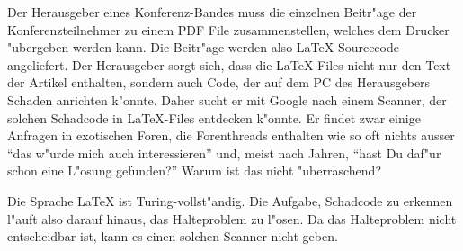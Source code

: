 Der Herausgeber eines Konferenz-Bandes muss die einzelnen Beitr"age der 
Konferenzteilnehmer zu einem PDF File zusammenstellen, welches dem Drucker
"ubergeben werden kann.
Die Beitr"age werden also \LaTeX-Sourcecode angeliefert.
Der Herausgeber sorgt sich, dass die \LaTeX-Files nicht nur den Text
der Artikel enthalten, sondern auch Code, der auf dem PC des Herausgebers
Schaden anrichten k"onnte.
Daher sucht er mit Google nach einem Scanner, der solchen Schadcode  in
\LaTeX-Files entdecken k"onnte.
Er findet zwar einige Anfragen in exotischen Foren, die Forenthreads
enthalten wie so oft nichts ausser ``das w"urde mich auch interessieren'' und,
meist nach Jahren, ``hast Du daf"ur schon eine L"osung gefunden?''
Warum ist das nicht "uberraschend?

\begin{loesung}
Die Sprache \LaTeX{} ist Turing-vollst"andig.
Die Aufgabe, Schadcode zu erkennen l"auft also darauf hinaus, das Halteproblem
zu l"osen.
Da das Halteproblem nicht entscheidbar ist, kann es einen solchen Scanner
nicht geben.
\end{loesung}

